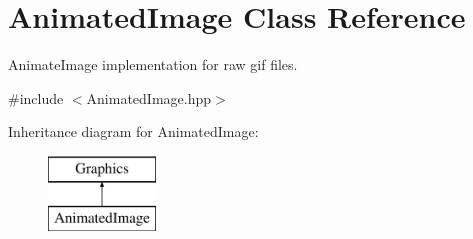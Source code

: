 \hypertarget{class_animated_image}{}\section{Animated\+Image Class Reference}
\label{class_animated_image}


Animate\+Image implementation for raw gif files.  




{\ttfamily \#include $<$Animated\+Image.\+hpp$>$}

Inheritance diagram for Animated\+Image\+:\begin{figure}[H]
\begin{center}
\leavevmode
\includegraphics[height=2.000000cm]{class_animated_image}
\end{center}
\end{figure}
